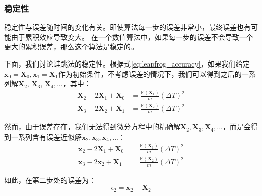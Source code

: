 {\subsubsection{稳定性}
稳定性与误差随时间的变化有关。即使算法每一步的误差非常小，最终误差也有可能由于累积效应导致变大。
在一个数值算法中，如果每一步的误差不会导致一个更大的累积误差，那么这个算法是稳定的。

下面，我们讨论蛙跳法的稳定性。根据式\ref{eq:leapfrog_accuracy}，如果我们给定$\mathbf{x}_0 = \mathbf{X}_0,\mathbf{x}_1 = \mathbf{X}_1$作为初始条件，不考虑误差的情况下，我们可以得到之后的一系列解$\mathbf{X}_2$, $\mathbf{X}_3$, $\mathbf{X}_4,...$，其中：
      \begin{align}
         \label{eq:leapfrog_stability1}
         \mathbf{X}_{2}-2\mathbf{X}_{1}+\mathbf{X}_{0} &= \frac{\mathbf{F}(\mathbf{X}_1)}{m} {(\Delta T)^2} \\
         \label{eq:leapfrog_stability2}
         \mathbf{X}_{3}-2\mathbf{X}_{2}+\mathbf{X}_{1} &= \frac{\mathbf{F}(\mathbf{X}_2)}{m} {(\Delta T)^2}
      \end{align}

然而，由于误差存在，我们无法得到微分方程中的精确解$\mathbf{X}_2,\mathbf{X}_3,\mathbf{X}_4,...$，而是会得到一系列含有误差近似解$\mathbf{x}_2,\mathbf{x}_3,\mathbf{x}_4,...$：
      \begin{align}
         \label{eq:leapfrog_stability3}
         \mathbf{x}_{2}-2\mathbf{X}_{1}+\mathbf{X}_{0} &= \frac{\mathbf{F}(\mathbf{X}_1)}{m} {(\Delta T)^2} \\
         \label{eq:leapfrog_stability4}
         \mathbf{x}_{3}-2\mathbf{x}_{2}+\mathbf{X}_{1} &= \frac{\mathbf{F}(\mathbf{X}_2)}{m} {(\Delta T)^2}
      \end{align}

如此，在第二步处的误差为：
      \begin{equation}
         \label{eq:leapfrog_stability5}
         {\epsilon}_2 = \mathbf{x}_2 -\mathbf{X}_2
      \end{equation}

}
